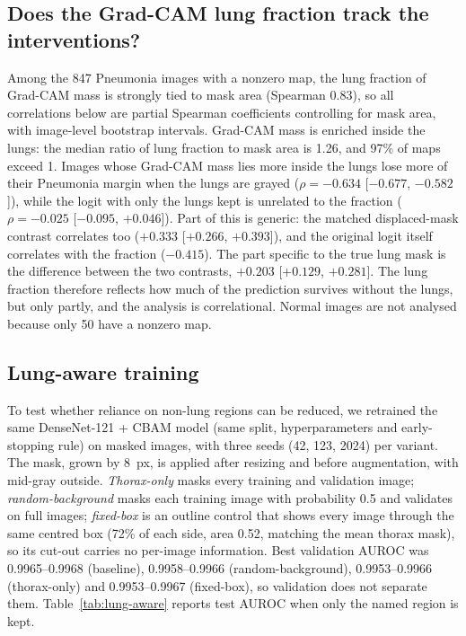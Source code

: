 \subsection{Does the Grad-CAM lung fraction track the interventions?}
Among the 847 Pneumonia images with a nonzero map, the lung fraction of Grad-CAM mass is strongly tied to
mask area (Spearman 0.83), so all correlations below are partial Spearman coefficients controlling for mask
area, with image-level bootstrap intervals. Grad-CAM mass is enriched inside the lungs: the median ratio of
lung fraction to mask area is 1.26, and 97\% of maps exceed 1. Images whose Grad-CAM mass lies more inside the
lungs lose more of their Pneumonia margin when the lungs are grayed ($\rho=-0.634$ [$-0.677$, $-0.582$]), while
the logit with only the lungs kept is unrelated to the fraction ($\rho=-0.025$ [$-0.095$, $+0.046$]). Part of
this is generic: the matched displaced-mask contrast correlates too ($+0.333$ [$+0.266$, $+0.393$]), and the
original logit itself correlates with the fraction ($-0.415$). The part specific to the true lung mask is the
difference between the two contrasts, $+0.203$ [$+0.129$, $+0.281$]. The lung fraction therefore reflects how
much of the prediction survives without the lungs, but only partly, and the analysis is correlational. Normal
images are not analysed because only 50 have a nonzero map.

\subsection{Lung-aware training}
\label{sec:lung-aware}
To test whether reliance on non-lung regions can be reduced, we retrained the same DenseNet-121 + CBAM model
(same split, hyperparameters and early-stopping rule) on masked images, with three seeds (42, 123, 2024) per
variant. The mask, grown by 8~px, is applied after resizing and before augmentation, with mid-gray outside.
\emph{Thorax-only} masks every training and validation image; \emph{random-background} masks each training
image with probability 0.5 and validates on full images; \emph{fixed-box} is an outline control that shows every
image through the same centred box (72\% of each side, area 0.52, matching the mean thorax mask), so its
cut-out carries no per-image information. Best validation AUROC was 0.9965--0.9968 (baseline), 0.9958--0.9966
(random-background), 0.9953--0.9966 (thorax-only) and 0.9953--0.9967 (fixed-box), so validation does not
separate them. Table~\ref{tab:lung-aware} reports test AUROC when only the named region is kept.

